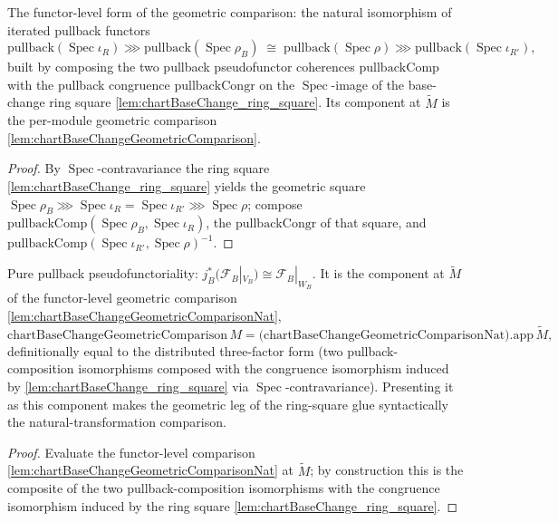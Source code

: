 \begin{lemma}
  \label{lem:chartBaseChangeGeometricComparisonNat}
  The functor-level form of the geometric comparison: the natural isomorphism of iterated pullback
  functors
  \[
    \mathrm{pullback}(\operatorname{Spec}\iota_R) \ggg \mathrm{pullback}(\operatorname{Spec}\rho_B)
      \;\cong\;
    \mathrm{pullback}(\operatorname{Spec}\rho) \ggg \mathrm{pullback}(\operatorname{Spec}\iota_{R'}),
  \]
  built by composing the two pullback pseudofunctor coherences \(\mathrm{pullbackComp}\) with the
  pullback congruence \(\mathrm{pullbackCongr}\) on the \(\operatorname{Spec}\)-image of the
  base-change ring square \cref{lem:chartBaseChange_ring_square}. Its component at \(\widetilde M\) is
  the per-module geometric comparison \cref{lem:chartBaseChangeGeometricComparison}.
  \begin{proof}
    By \(\operatorname{Spec}\)-contravariance the ring square \cref{lem:chartBaseChange_ring_square}
    yields the geometric square \(\operatorname{Spec}\rho_B \ggg \operatorname{Spec}\iota_R =
    \operatorname{Spec}\iota_{R'} \ggg \operatorname{Spec}\rho\); compose
    \(\mathrm{pullbackComp}(\operatorname{Spec}\rho_B,\operatorname{Spec}\iota_R)\), the
    \(\mathrm{pullbackCongr}\) of that square, and
    \(\mathrm{pullbackComp}(\operatorname{Spec}\iota_{R'},\operatorname{Spec}\rho)^{-1}\).
  \end{proof}
\end{lemma}

\begin{lemma}
  \label{lem:chartBaseChangeGeometricComparison}
  Pure pullback pseudofunctoriality: \(j_B^{*}(\mathcal{F}_B|_{V_B})\cong\mathcal{F}_B|_{W_B}\). It is
  the component at \(\widetilde M\) of the functor-level geometric comparison
  \cref{lem:chartBaseChangeGeometricComparisonNat},
  \[
    \mathrm{chartBaseChangeGeometricComparison}\,M
      = \bigl(\mathrm{chartBaseChangeGeometricComparisonNat}\bigr).\mathrm{app}\,\widetilde M,
  \]
  definitionally equal to the distributed three-factor form (two pullback-composition isomorphisms
  composed with the congruence isomorphism induced by \cref{lem:chartBaseChange_ring_square} via
  \(\operatorname{Spec}\)-contravariance). Presenting it as this component makes the geometric leg of
  the ring-square glue syntactically the natural-transformation comparison.
  \begin{proof}
    Evaluate the functor-level comparison \cref{lem:chartBaseChangeGeometricComparisonNat} at
    \(\widetilde M\); by construction this is the composite of the two pullback-composition
    isomorphisms with the congruence isomorphism induced by the ring square
    \cref{lem:chartBaseChange_ring_square}.
  \end{proof}
\end{lemma}

